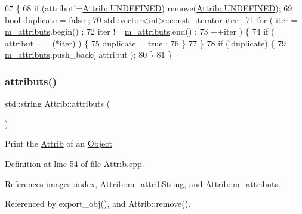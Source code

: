 \begin{DoxyCode}
67                             \{
68     \textcolor{keywordflow}{if} (attribut!=\hyperlink{classAttrib_a69e171d7cc6417835a5a306d3c764235a3a8da2ab97dda18aebab196fe4100531}{Attrib::UNDEFINED}) \textcolor{keyword}{remove}(\hyperlink{classAttrib_a69e171d7cc6417835a5a306d3c764235a3a8da2ab97dda18aebab196fe4100531}{Attrib::UNDEFINED});
69     \textcolor{keywordtype}{bool} duplicate = false ;
70     std::vector<int>::const\_iterator iter ;
71     \textcolor{keywordflow}{for} ( iter  = \hyperlink{classAttrib_ac4bd58a0cc6b38a3b711d609a3d3aacc}{m\_attributs}.begin() ;
72           iter != \hyperlink{classAttrib_ac4bd58a0cc6b38a3b711d609a3d3aacc}{m\_attributs}.end()   ;
73           ++iter ) \{
74       \textcolor{keywordflow}{if} ( attribut == (*iter) ) \{
75         duplicate = true ;
76       \}
77     \}
78     \textcolor{keywordflow}{if} (!duplicate) \{
79       \hyperlink{classAttrib_ac4bd58a0cc6b38a3b711d609a3d3aacc}{m\_attributs}.push\_back( attribut );
80     \}
81   \}
\end{DoxyCode}
\mbox{\label{classAttrib_aee7bbf16b144887f196e1341b24f8a26}} 
\subsubsection{\texorpdfstring{attributs()}{attributs()}}
{\footnotesize\ttfamily std\+::string Attrib\+::attributs (\begin{DoxyParamCaption}{ }\end{DoxyParamCaption})\hspace{0.3cm}{\ttfamily [inherited]}}

Print the \hyperlink{classAttrib}{Attrib} of an \hyperlink{classObject}{Object} 

Definition at line 54 of file Attrib.\+cpp.



References images\+::index, Attrib\+::m\+\_\+attrib\+String, and Attrib\+::m\+\_\+attributs.



Referenced by export\+\_\+obj(), and Attrib\+::remove().


